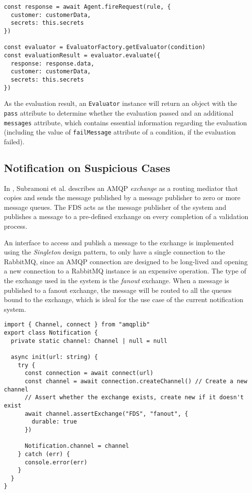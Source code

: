       \begin{lstlisting}[style=es6, caption={EvaluatorFactory usage in ValidationEngine class (TypeScript)}]
const response = await Agent.fireRequest(rule, {
  customer: customerData,
  secrets: this.secrets
})

const evaluator = EvaluatorFactory.getEvaluator(condition)
const evaluationResult = evaluator.evaluate({
  response: response.data,
  customer: customerData,
  secrets: this.secrets
})
      \end{lstlisting}

      As the evaluation result, an \verb;Evaluator; instance will return an object with the \verb;pass; attribute to determine whether the evaluation passed and an additional \verb;messages; attribute, which contains essential information regarding the evaluation (including the value of \verb;failMessage; attribute of a condition, if the evaluation failed). 

  \subsection{Notification on Suspicious Cases}
      
    In \autocite{amqp}, Subramoni et al. describes an AMQP \emph{exchange} as a routing mediator that copies and sends the message published by a message publisher to zero or more message queues. The FDS acts as the message publisher of the system and publishes a message to a pre-defined exchange on every completion of a validation process. 
    
    An interface to access and publish a message to the exchange is implemented using the \emph{Singleton} \autocite[pp. 127-134]{gamma-1995} design pattern, to only have a single connection to the RabbitMQ, since an AMQP connection are designed to be long-lived and opening a new connection to a RabbitMQ instance is an expensive operation. The type of the exchange used in the system is the \emph{fanout} exchange. When a message is published to a fanout exchange, the message will be routed to all the queues bound to the exchange, which is ideal for the use case of the current notification system. 

    \begin{lstlisting}[style=es6, caption={Openning a connection to RabbitMQ instance (TypeScript)}]
import { Channel, connect } from "amqplib"
export class Notification {
  private static channel: Channel | null = null

  async init(url: string) {
    try {
      const connection = await connect(url)
      const channel = await connection.createChannel() // Create a new channel
      // Assert whether the exchange exists, create new if it doesn't exist
      await channel.assertExchange("FDS", "fanout", {
        durable: true 
      }) 

      Notification.channel = channel
    } catch (err) {
      console.error(err)
    }
  }
}
    \end{lstlisting}
    
